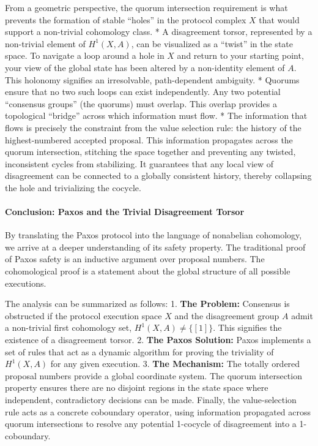 \documentclass[
]{article}
\begin{document}
From a geometric perspective, the quorum intersection requirement is
what prevents the formation of stable ``holes'' in the protocol complex
\(X\) that would support a non-trivial cohomology class. * A
disagreement torsor, represented by a non-trivial element of
\(H^1(X, A)\), can be visualized as a ``twist'' in the state space. To
navigate a loop around a hole in \(X\) and return to your starting
point, your view of the global state has been altered by a non-identity
element of \(A\). This holonomy signifies an irresolvable,
path-dependent ambiguity. * Quorums ensure that no two such loops can
exist independently. Any two potential ``consensus groups'' (the
quorums) must overlap. This overlap provides a topological ``bridge''
across which information must flow. * The information that flows is
precisely the constraint from the value selection rule: the history of
the highest-numbered accepted proposal. This information propagates
across the quorum intersection, stitching the space together and
preventing any twisted, inconsistent cycles from stabilizing. It
guarantees that any local view of disagreement can be connected to a
globally consistent history, thereby collapsing the hole and
trivializing the cocycle.

\paragraph{Conclusion: Paxos and the Trivial Disagreement
Torsor}\label{conclusion-paxos-and-the-trivial-disagreement-torsor}

By translating the Paxos protocol into the language of nonabelian
cohomology, we arrive at a deeper understanding of its safety property.
The traditional proof of Paxos safety is an inductive argument over
proposal numbers. The cohomological proof is a statement about the
global structure of all possible executions.

The analysis can be summarized as follows: 1. \textbf{The Problem:}
Consensus is obstructed if the protocol execution space \(X\) and the
disagreement group \(A\) admit a non-trivial first cohomology set,
\(H^1(X, A) \neq \{[1]\}\). This signifies the existence of a
disagreement torsor. 2. \textbf{The Paxos Solution:} Paxos implements a
set of rules that act as a dynamic algorithm for proving the triviality
of \(H^1(X, A)\) for any given execution. 3. \textbf{The Mechanism:} The
totally ordered proposal numbers provide a global coordinate system. The
quorum intersection property ensures there are no disjoint regions in
the state space where independent, contradictory decisions can be made.
Finally, the value-selection rule acts as a concrete coboundary
operator, using information propagated across quorum intersections to
resolve any potential 1-cocycle of disagreement into a 1-coboundary.
\end{document}
